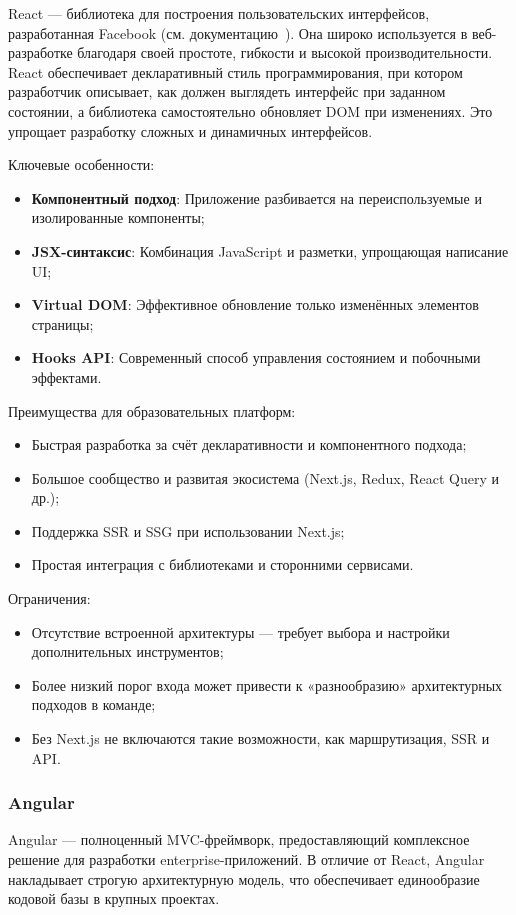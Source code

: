 React — библиотека для построения пользовательских интерфейсов, разработанная Facebook (см. документацию~\cite{react_getting_started}). Она широко используется в веб-разработке благодаря своей простоте, гибкости и высокой производительности. React обеспечивает декларативный стиль программирования, при котором разработчик описывает, как должен выглядеть интерфейс при заданном состоянии, а библиотека самостоятельно обновляет DOM при изменениях. Это упрощает разработку сложных и динамичных интерфейсов.

Ключевые особенности:
\begin{itemize}
  \item \textbf{Компонентный подход}: Приложение разбивается на переиспользуемые и изолированные компоненты;
  \item \textbf{JSX-синтаксис}: Комбинация JavaScript и разметки, упрощающая написание UI;
  \item \textbf{Virtual DOM}: Эффективное обновление только изменённых элементов страницы;
  \item \textbf{Hooks API}: Современный способ управления состоянием и побочными эффектами.
\end{itemize}

Преимущества для образовательных платформ:
\begin{itemize}
  \item Быстрая разработка за счёт декларативности и компонентного подхода;
  \item Большое сообщество и развитая экосистема (Next.js, Redux, React Query и др.);
  \item Поддержка SSR и SSG при использовании Next.js;
  \item Простая интеграция с библиотеками и сторонними сервисами.
\end{itemize}

Ограничения:
\begin{itemize}
  \item Отсутствие встроенной архитектуры — требует выбора и настройки дополнительных инструментов;
  \item Более низкий порог входа может привести к «разнообразию» архитектурных подходов в команде;
  \item Без Next.js не включаются такие возможности, как маршрутизация, SSR и API.
\end{itemize}

\subsubsection{Angular}
Angular — полноценный MVC-фреймворк, предоставляющий комплексное решение для разработки enterprise-приложений\cite{angular_overview}. В отличие от React, Angular накладывает строгую архитектурную модель, что обеспечивает единообразие кодовой базы в крупных проектах.

